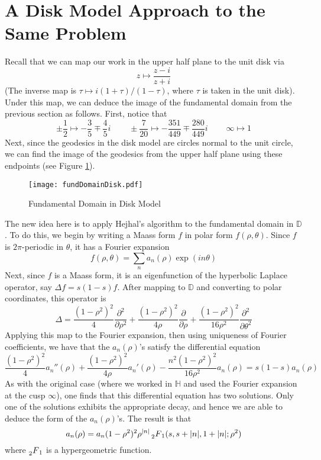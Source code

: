 \documentclass[]{article}
\begin{document}
\section{A Disk Model Approach to the Same Problem}

Recall that we can map our work in the upper half plane to the unit disk via
$$
z \mapsto \frac{z - i}{z + i}
$$
(The inverse map is $\tau \mapsto i(1+\tau)/(1-\tau)$, where $\tau$ is taken in the unit disk).
Under this map, we can deduce the image of the fundamental domain from the previous section as follows.
First, notice that
$$
\pm\frac{1}{2} \mapsto -\frac{3}{5} \mp \frac{4}{5}i ~~~~~~~~~~
\pm\frac{7}{20} \mapsto -\frac{351}{449} \mp \frac{280}{449}i ~~~~~~~~~~
\infty \mapsto 1
$$
Next, since the geodesics in the disk model are circles normal to the unit circle, we can find the image of the geodesics from the upper half plane using these endpoints (see Figure \ref{fundDomainDisk}).
\begin{figure}[h]
	\centering
	\texttt{[image: fundDomainDisk.pdf]}
	\caption{Fundamental Domain in Disk Model}
	\label{fundDomainDisk}
\end{figure}

The new idea here is to apply Hejhal's algorithm to the fundamental domain in $\mathbb{D}$.
To do this, we begin by writing a Maass form $f$ in polar form $f(\rho, \theta)$.
Since $f$ is $2\pi$-periodic in $\theta$, it has a Fourier expansion
$$
f(\rho, \theta) = \sum_n a_n(\rho)\exp(in\theta)
$$
Next, since $f$ is a Maass form, it is an eigenfunction of the hyperbolic Laplace operator, say $\Delta f = s(1-s)f$.
After mapping to $\mathbb{D}$ and converting to polar coordinates, this operator is
$$
\Delta = \frac{(1 - \rho^2)^2}{4}\frac{\partial^2}{\partial\rho^2} +
\frac{(1 - \rho^2)^2}{4\rho}\frac{\partial}{\partial\rho} +
\frac{(1 - \rho^2)^2}{16\rho^2}\frac{\partial^2}{\partial\theta^2}
$$
Applying this map to the Fourier expansion, then using uniqueness of Fourier coefficients, we have that the $a_n(\rho)$'s satisfy the differential equation
$$
\frac{(1-\rho^2)^2}{4}a_n''(\rho) + \frac{(1-\rho^2)^2}{4\rho}a_n'(\rho) - \frac{n^2(1-\rho^2)^2}{16\rho^2}a_n(\rho) = s(1-s)a_n(\rho)
$$
As with the original case (where we worked in $\mathbb{H}$ and used the Fourier expansion at the cusp $\infty$), one finds that this differential equation has two solutions.
Only one of the solutions exhibits the appropriate decay, and hence we are able to deduce the form of the $a_n(\rho)$'s.
The result is that
$$
a_n(\rho) = a_n(1 - \rho^2)^2\rho^{|n|} \prescript{}{2}{F}_1(s, s+|n|, 1+|n|; \rho^2)
$$
where $\prescript{}{2}{F}_1$ is a hypergeometric function.
\\
\end{document}
